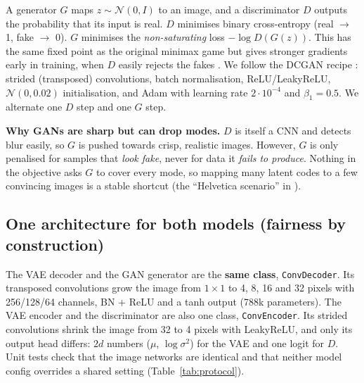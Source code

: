 \documentclass[11pt,letterpaper]{article}
\begin{document}
A generator \(G\) maps \(z\sim\mathcal N(0,I)\) to an image, and a
discriminator \(D\) outputs the probability that its input is real.
\(D\) minimises binary cross-entropy (real \(\to\) 1, fake \(\to\) 0).
\(G\) minimises the \emph{non-saturating} loss \(-\log D(G(z))\). This
has the same fixed point as the original minimax game but gives stronger
gradients early in training, when \(D\) easily rejects the fakes
\cite{goodfellow2014}. We follow the DCGAN recipe \cite{radford2016}:
strided (transposed) convolutions, batch normalisation, ReLU/LeakyReLU,
\(\mathcal N(0,0.02)\) initialisation, and Adam with learning rate
\(2\cdot10^{-4}\) and \(\beta_1=0.5\). We alternate one \(D\) step and
one \(G\) step.

\textbf{Why GANs are sharp but can drop modes.} \(D\) is itself a CNN
and detects blur easily, so \(G\) is pushed towards crisp, realistic
images. However, \(G\) is only penalised for samples that \emph{look
fake}, never for data it \emph{fails to produce}. Nothing in the
objective asks \(G\) to cover every mode, so mapping many latent codes
to a few convincing images is a stable shortcut (the ``Helvetica
scenario'' in \cite{goodfellow2014}).

\subsection{One architecture for both models (fairness by
construction)}\label{sec:architecture}

The VAE decoder and the GAN generator are the \textbf{same class},
\texttt{ConvDecoder}. Its transposed convolutions grow the image from
\(1 \times 1\) to 4, 8, 16 and 32 pixels with 256/128/64 channels, BN +
ReLU and a tanh output (788k parameters). The VAE encoder and the
discriminator are also one class, \texttt{ConvEncoder}. Its strided
convolutions shrink the image from 32 to 4 pixels with LeakyReLU, and
only its output head differs: \(2d\) numbers (\(\mu\), \(\log\sigma^2\))
for the VAE and one logit for \(D\). Unit tests check that the image
networks are identical and that neither model config overrides a shared
setting (Table~\ref{tab:protocol}).
\end{document}
